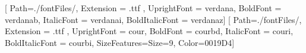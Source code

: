 

\usepackage{fontspec}
\setmainfont{Verdana}[
  Path=./fontFiles/,
  Extension = .ttf ,
  UprightFont = verdana,
  BoldFont = verdanab,
  ItalicFont = verdanai,
  BoldItalicFont = verdanaz]
\setmonofont{Courier New}[
  Path=./fontFiles/,
  Extension = .ttf ,
  UprightFont = cour,
  BoldFont = courbd,
  ItalicFont = couri,
  BoldItalicFont = courbi,
  SizeFeatures={Size=9},
  Color={0019D4}]


\usepackage{makeidx}
\makeindex

\newcommand{\scscst}{\scriptscriptstyle}%
\newcommand{\scst}{\scriptstyle}%
\newcommand{\Robject}[1]{\textit{\textbf{#1}}}%
\newcommand{\Rfunction}[1]{\textit{#1}}%
\newcommand{\Rclass}[1]{\textit{#1}}%
\newcommand{\Rpackage}[1]{\textbf{#1}}%
\newcommand{\Rexpression}[1]{\texttt{#1}}%
\newcommand{\Rmethod}[1]{\texttt{#1}}%
\newcommand{\Rfunarg}[1]{\texttt{#1}}%
\newcommand{\filename}[1]{\textsf{#1}}%

